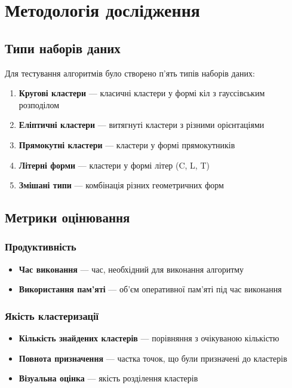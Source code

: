 \documentclass[12pt,a4paper]{article}
\begin{document}
\section{Методологія дослідження}

\subsection{Типи наборів даних}

Для тестування алгоритмів було створено п'ять типів наборів даних:

\begin{enumerate}
    \item \textbf{Кругові кластери} — класичні кластери у формі кіл з гауссівським розподілом
    \item \textbf{Еліптичні кластери} — витягнуті кластери з різними орієнтаціями
    \item \textbf{Прямокутні кластери} — кластери у формі прямокутників
    \item \textbf{Літерні форми} — кластери у формі літер (C, L, T)
    \item \textbf{Змішані типи} — комбінація різних геометричних форм
\end{enumerate}

\subsection{Метрики оцінювання}

\subsubsection{Продуктивність}
\begin{itemize}
    \item \textbf{Час виконання} — час, необхідний для виконання алгоритму
    \item \textbf{Використання пам'яті} — об'єм оперативної пам'яті під час виконання
\end{itemize}

\subsubsection{Якість кластеризації}
\begin{itemize}
    \item \textbf{Кількість знайдених кластерів} — порівняння з очікуваною кількістю
    \item \textbf{Повнота призначення} — частка точок, що були призначені до кластерів
    \item \textbf{Візуальна оцінка} — якість розділення кластерів
\end{itemize}
\end{document}

